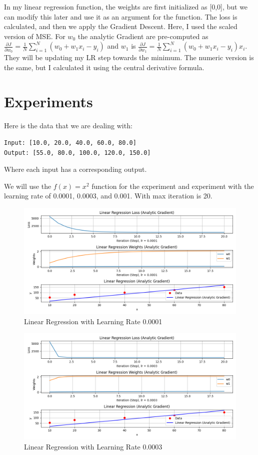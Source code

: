 \documentclass{article}
\begin{document}
\noindent In my linear regression function, the weights are first initialized as [0,0], but we can modify this later and use it as an argument for the function. The loss is calculated, and then we apply the Gradient Descent. Here, I used the scaled version of MSE. For $w_0$ the analytic Gradient are pre-computed as $\frac{\partial J}{\partial w_0} = \frac{1}{N} \sum_{i=1}^{N} (w_0 + w_1 x_i - y_i)$ and $w_1$ is $\frac{\partial J}{\partial w_1} = \frac{1}{N} \sum_{i=1}^{N} (w_0 + w_1 x_i - y_i) x_i$. They will be updating my LR step towards the minimum. The numeric version is the same, but I calculated it using the central derivative formula.

\section{Experiments}
Here is the data that we are dealing with:
\begin{verbatim}
Input: [10.0, 20.0, 40.0, 60.0, 80.0]
Output: [55.0, 80.0, 100.0, 120.0, 150.0]
\end{verbatim}
Where each input has a corresponding output.

We will use the $f(x) = x^2$ function for the experiment and experiment with the learning rate of 0.0001, 0.0003, and 0.001. With max iteration is 20.

\begin{figure}[ht]
  \centering
  \includegraphics[width=1\textwidth]{images/lab2/linear_regression_(0.0001).png}
  \caption{Linear Regression with Learning Rate 0.0001}
  \label{fig:lr_0.0001}
\end{figure}

\begin{figure}[ht]
  \centering
  \includegraphics[width=1\textwidth]{images/lab2/linear_regression_(0.0003).png}
  \caption{Linear Regression with Learning Rate 0.0003}
  \label{fig:lr_0.0003}
\end{figure}
\end{document}
